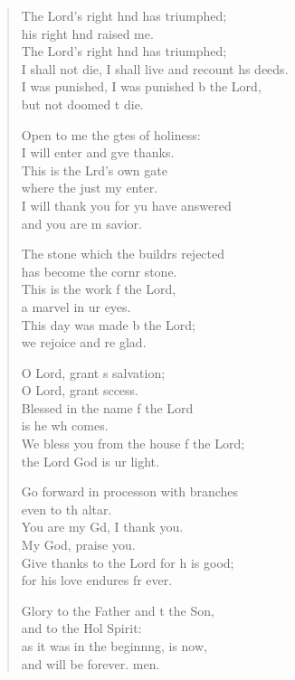 \begin{verse}
\begin{patverse}
    The Lord’s right hnd has triumphed;\Med\\
    his right hnd raised me.\\
    The Lord’s right hnd has triumphed;\Med\\
    I shall not die, I shall live and recount h\pointup{\i}s deeds.\\
    I was punished, I was punished b the Lord,\Med\\
    but not doomed t die.

    Open to me the gtes of holiness:\Med\\
    I will enter and g\pointup{\i}ve thanks.\\
    This is the Lrd’s own gate\Med\\
    where the just my enter.\\
    I will thank you for yu have answered\Med\\
    and you are m savior.

    The stone which the buildrs rejected\Med\\
    has become the cornr stone.\\
    This is the work f the Lord,\Med\\
    a marvel in ur eyes.\\
    This day was made b the Lord;\Med\\
    we rejoice and re glad.

    O Lord, grant s salvation;\Med\\
    O Lord, grant sccess.\\
    Blessed in the name f the Lord\Med\\
    is he wh comes.\\
    We bless you from the house f the Lord;\Med\\
    the Lord God is ur light.

    Go forward in process\pointup{\i}on with branches\Med\\
    even to th altar.\\
    You are my Gd, I thank you.\Med\\
    My God,  praise you.\\
    Give thanks to the Lord for h is good;\Med\\
    for his love endures fr ever.

    Glory to the Father and t the Son,\Med\\
    and to the Hol Spirit:\\
    as it was in the beginn\pointup{\i}ng, is now,\Med\\
    and will be forever. men.
  \end{patverse}
\end{verse}
